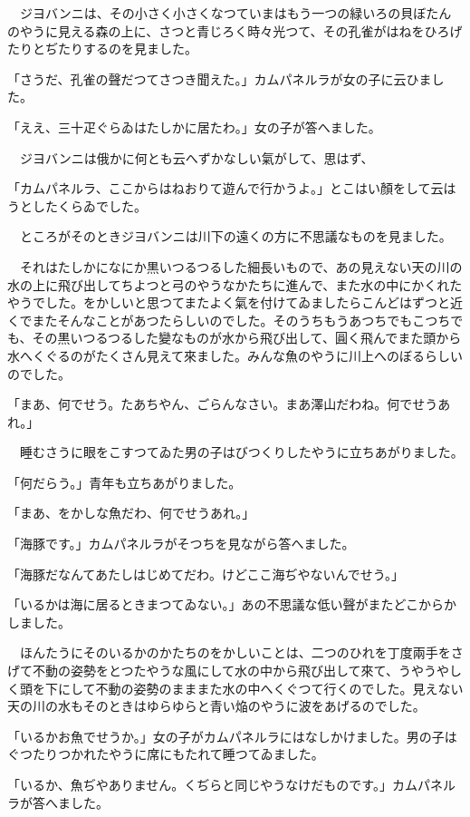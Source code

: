 \documentclass[tate,paper=b6j,jafontsize=9pt]{jlreq}
\begin{document}
　ジヨバンニは、その小さく小さくなつていまはもう一つの緑いろの貝ぼたんのやうに見える森の上に、さつと青じろく時々光つて、その孔雀がはねをひろげたりとぢたりするのを見ました。

「さうだ、孔雀の聲だつてさつき聞えた。」カムパネルラが女の子に云ひました。

「ええ、三十疋ぐらゐはたしかに居たわ。」女の子が答へました。

　ジヨバンニは俄かに何とも云へずかなしい氣がして、思はず、

「カムパネルラ、ここからはねおりて遊んで行かうよ。」とこはい顏をして云はうとしたくらゐでした。

　ところがそのときジヨバンニは川下の遠くの方に不思議なものを見ました。

　それはたしかになにか黒いつるつるした細長いもので、あの見えない天の川の水の上に飛び出してちよつと弓のやうなかたちに進んで、また水の中にかくれたやうでした。をかしいと思つてまたよく氣を付けてゐましたらこんどはずつと近くでまたそんなことがあつたらしいのでした。そのうちもうあつちでもこつちでも、その黒いつるつるした變なものが水から飛び出して、圓く飛んでまた頭から水へくぐるのがたくさん見えて來ました。みんな魚のやうに川上へのぼるらしいのでした。

「まあ、何でせう。たあちやん、ごらんなさい。まあ澤山だわね。何でせうあれ。」

　睡むさうに眼をこすつてゐた男の子はびつくりしたやうに立ちあがりました。

「何だらう。」青年も立ちあがりました。

「まあ、をかしな魚だわ、何でせうあれ。」

「海豚です。」カムパネルラがそつちを見ながら答へました。

「海豚だなんてあたしはじめてだわ。けどここ海ぢやないんでせう。」

「いるかは海に居るときまつてゐない。」あの不思議な低い聲がまたどこからかしました。

　ほんたうにそのいるかのかたちのをかしいことは、二つのひれを丁度兩手をさげて不動の姿勢をとつたやうな風にして水の中から飛び出して來て、うやうやしく頭を下にして不動の姿勢のまままた水の中へくぐつて行くのでした。見えない天の川の水もそのときはゆらゆらと青い焔のやうに波をあげるのでした。

「いるかお魚でせうか。」女の子がカムパネルラにはなしかけました。男の子はぐつたりつかれたやうに席にもたれて睡つてゐました。

「いるか、魚ぢやありません。くぢらと同じやうなけだものです。」カムパネルラが答へました。
\end{document}
